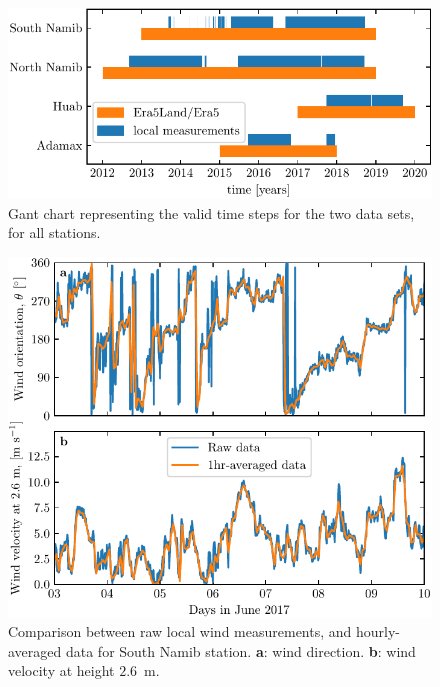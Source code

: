 \begin{figure}[p]
\centering
\includegraphics[scale=1]{Figures/Figure1_supp.pdf}
\caption{Gant chart representing the valid time steps for the two data sets, for all stations.}
\label{Fig1_supp}
\end{figure}

\begin{figure}[p]
\centering
\includegraphics[scale=1]{Figures/Figure2_supp.pdf}
\caption{Comparison between raw local wind measurements, and hourly-averaged data for South Namib station. \textbf{a}: wind direction. \textbf{b}: wind velocity at height $2.6$~m.}
\label{Fig2_supp}
\end{figure}

